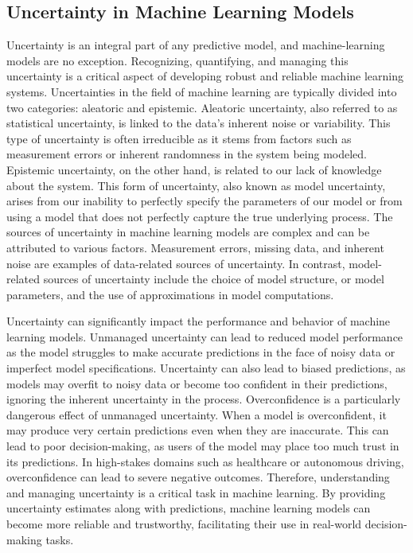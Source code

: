 \subsection{Uncertainty in Machine Learning Models}
Uncertainty is an integral part of any predictive model, and machine-learning models are no exception. Recognizing, quantifying, and managing this uncertainty is a critical aspect of developing robust and reliable machine learning systems. Uncertainties in the field of machine learning are typically divided into two categories: aleatoric and epistemic. Aleatoric uncertainty, also referred to as statistical uncertainty, is linked to the data's inherent noise or variability. This type of uncertainty is often irreducible as it stems from factors such as measurement errors or inherent randomness in the system being modeled. Epistemic uncertainty, on the other hand, is related to our lack of knowledge about the system. This form of uncertainty, also known as model uncertainty, arises from our inability to perfectly specify the parameters of our model or from using a model that does not perfectly capture the true underlying process. The sources of uncertainty in machine learning models are complex and can be attributed to various factors. Measurement errors, missing data, and inherent noise are examples of data-related sources of uncertainty. In contrast, model-related sources of uncertainty include the choice of model structure, or model parameters, and the use of approximations in model computations.

Uncertainty can significantly impact the performance and behavior of machine learning models. Unmanaged uncertainty can lead to reduced model performance as the model struggles to make accurate predictions in the face of noisy data or imperfect model specifications. Uncertainty can also lead to biased predictions, as models may overfit to noisy data or become too confident in their predictions, ignoring the inherent uncertainty in the process. Overconfidence is a particularly dangerous effect of unmanaged uncertainty. When a model is overconfident, it may produce very certain predictions even when they are inaccurate. This can lead to poor decision-making, as users of the model may place too much trust in its predictions. In high-stakes domains such as healthcare or autonomous driving, overconfidence can lead to severe negative outcomes. Therefore, understanding and managing uncertainty is a critical task in machine learning. By providing uncertainty estimates along with predictions, machine learning models can become more reliable and trustworthy, facilitating their use in real-world decision-making tasks.

